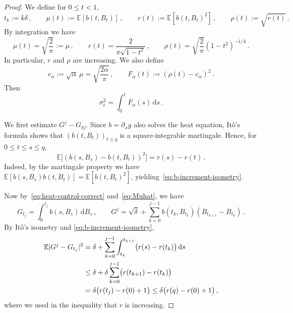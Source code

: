 \documentclass[11pt]{article}
\theoremstyle{definition}
\theoremstyle{remark}
\numberwithin{equation}{section}
\numberwithin{theorem}{section}
\newcommand{\E}{\mathbb E}
\newcommand{\rmd}{\mathrm{d}}
\begin{document}
\begin{proof} 
We define for $0\le t<1$,
\[
t_k:=k\delta\,,
\qquad
\mu(t):=\E[b(t,B_t)]\,,
\qquad
r(t):=\E[b(t,B_t)^2]\,,
\qquad
\rho(t):=\sqrt{r(t)}\,.
\]
By integration we have
\begin{equation}\label{eq:heat-control-moments}
 \mu(t)=\sqrt{\frac{2}{\pi}}:=\mu\,,
 \qquad
 r(t)=\frac{2}{\pi\sqrt{1-t^2}}\,,
 \qquad
 \rho(t)=\sqrt{\frac{2}{\pi}}(1-t^2)^{-1/4}\,.
\end{equation}
In particular, $r$ and $\rho$ are increasing. We also define
\begin{equation}\label{eq:cF_alpha_def}
 c_\alpha:=\sqrt\alpha\,\mu=\sqrt{\frac{2\alpha}{\pi}}\,,
 \qquad
 F_\alpha(t):=(\rho(t)-c_\alpha)^2\,.
\end{equation}
Then
\begin{equation}\label{eq:continuous-variance-F}
 \sigma_t^2=\int_0^tF_\alpha(s)\,\rmd s\,.
\end{equation}

We first estimate $G^j - G_{\delta j}$. Since $b=\partial_xg$ also solves the heat equation, It\^{o}'s formula shows that $(b(t,B_t))_{t\le q}$ is a square-integrable martingale.  Hence, for
$0\le t\le s\le q$,
\begin{equation}\label{eq:b-increment-isometry}
\E\bigl[(b(s,B_s)-b(t,B_t))^2\bigr] = r(s)-r(t)\,.
\end{equation}
Indeed, by the martingale property we have
$\E[b(s,B_s)b(t,B_t)]=\E[b(t,B_t)^2]$, yielding~\eqref{eq:b-increment-isometry}. 

Now by~\eqref{eq:heat-control-correct} and~\eqref{eq:Muhat}, we have
\[
G_{t_j}=\int_0^{t_j}b(s,B_s)\,\rmd B_s\,,
\qquad
G^j= \sqrt{\delta} + \sum_{k=0}^{j-1}
b(t_k,B_{t_k})(B_{t_{k+1}}-B_{t_k})\,.
\]
By It\^{o}'s isometry and \eqref{eq:b-increment-isometry},
\begin{align}
\E|G^j-G_{t_j}|^2
&=
\delta + \sum_{k=0}^{j-1}\int_{t_k}^{t_{k+1}}
\bigl(r(s)-r(t_k)\bigr)\,\rmd s\notag\\
&\le
\delta + \delta\sum_{k=0}^{j-1}
\bigl(r(t_{k+1})-r(t_k)\bigr)\notag\\
&=
\delta\bigl(r(t_j)-r(0) + 1\bigr)
\le
\delta\bigl(r(q)-r(0) + 1\bigr)\,,
\label{eq:G-discretization-explicit}
\end{align}
where we used in the inequality that $r$ is increasing.


\end{proof}
\end{document}
